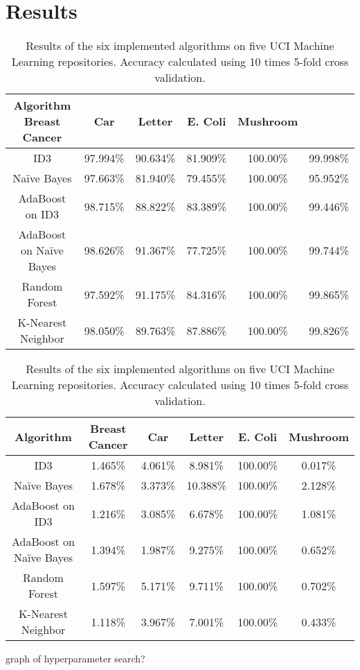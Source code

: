 \documentclass[11pt]{article}
\begin{document}
\section{Results}
\begin{table}
  \begin{tabular}{ |c|c|c|c|c|c| }
    \hline
    Algorithm               Breast Cancer   & Car      & Letter   & E. Coli  & Mushroom \\ \hline
    ID3                     & 97.994\%      & 90.634\% & 81.909\% & 100.00\% & 99.998\% \\ \hline
    Naïve Bayes             & 97.663\%      & 81.940\% & 79.455\% & 100.00\% & 95.952\% \\ \hline
    AdaBoost on ID3         & 98.715\%      & 88.822\% & 83.389\% & 100.00\% & 99.446\% \\ \hline
    AdaBoost on Naïve Bayes & 98.626\%      & 91.367\% & 77.725\% & 100.00\% & 99.744\% \\ \hline
    Random Forest           & 97.592\%      & 91.175\% & 84.316\% & 100.00\% & 99.865\% \\ \hline
    K-Nearest Neighbor      & 98.050\%      & 89.763\% & 87.886\% & 100.00\% & 99.826\% \\ \hline
  \end{tabular}
  \caption{Results of the six implemented algorithms on five UCI Machine Learning repositories. Accuracy calculated using 10 times 5-fold cross validation.}
\end{table}

\begin{table}
  \begin{tabular}{ |c|c|c|c|c|c| }
    \hline
    Algorithm               & Breast Cancer & Car      & Letter   & E. Coli  & Mushroom \\ \hline
    ID3                     & 1.465\%       & 4.061\%  & 8.981\%  & 100.00\% & 0.017\%  \\ \hline
    Naïve Bayes             & 1.678\%       & 3.373\%  & 10.388\% & 100.00\% & 2.128\%  \\ \hline
    AdaBoost on ID3         & 1.216\%       & 3.085\%  & 6.678\%  & 100.00\% & 1.081\%  \\ \hline
    AdaBoost on Naïve Bayes & 1.394\%       & 1.987\%  & 9.275\%  & 100.00\% & 0.652\%  \\ \hline
    Random Forest           & 1.597\%       & 5.171\%  & 9.711\%  & 100.00\% & 0.702\%  \\ \hline
    K-Nearest Neighbor      & 1.118\%       & 3.967\%  & 7.001\%  & 100.00\% & 0.433\%  \\ \hline
  \end{tabular}
  \caption{Results of the six implemented algorithms on five UCI Machine Learning repositories. Accuracy calculated using 10 times 5-fold cross validation.}
\end{table}

graph of hyperparameter search?



\end{document}
